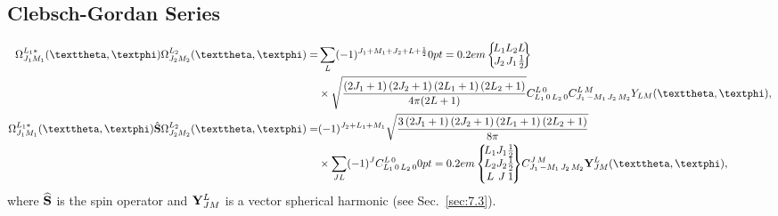 \subsection{Clebsch-Gordan Series}\label{sec:7.2.8}
\begin{align}
\Omega_{J_{1} M_{1}}^{L_{1}*}(\vartheta, \varphi) \Omega_{J_{2} M_{2}}^{L_{2}}(\vartheta, \varphi)=&\sum_{L}(-1)^{J_{1}+M_{1}+J_{2}+L+\frac{1}{2}}\sixj{L_{1}}{L_{2}}{L}{J_{2}}{J_{1}}{\frac{1}{2}}  \notag\\
&\times \sqrt{\frac{\left(2 J_{1}+1\right)\left(2 J_{2}+1\right)\left(2 L_{1}+1\right)\left(2 L_{2}+1\right)}{4 \pi(2 L+1)}} \clebsch{L_{1}}{0}{L_{2}}{0}{L}{0} \clebsch{J_{1}}{-M_{1}}{J_{2}}{M_{2}}{L}{M} Y_{L M}(\vartheta, \varphi),  \label{eq:7:2:40}\\
\Omega_{J_{1} M_{1}}^{L_{1}*}(\vartheta, \varphi) \hat{\vect{S}} \Omega_{J_{2} M_{2}}^{L_{2}}(\vartheta, \varphi)=&(-1)^{J_{2}+L_{1}+M_{1}} \sqrt{\frac{3\left(2 J_{1}+1\right)\left(2 J_{2}+1\right)\left(2 L_{1}+1\right)\left(2 L_{2}+1\right)}{8 \pi}}  \notag\\
&\times \sum_{J L}(-1)^{J} \clebsch{L_{1}}{0}{L_{2}}{0}{L}{0}
\ninej{L_{1}}{J_{1}}{\frac{1}{2}}%
{L_{2}}{J_{2}}{\frac{1}{2}}%
{L}{J}{1} \clebsch{J_{1}}{-M_{1}}{J_{2}}{M_{2}}{J}{M} \vect{Y}_{J M}^{L}(\vartheta, \varphi), \label{eq:7:2:41}
\end{align}
where $\widehat{\mathbf{S}}$ is the spin operator and $\mathbf{Y}_{J M}^{L}$ is a vector spherical harmonic (see Sec.~\ref{sec:7.3}).

